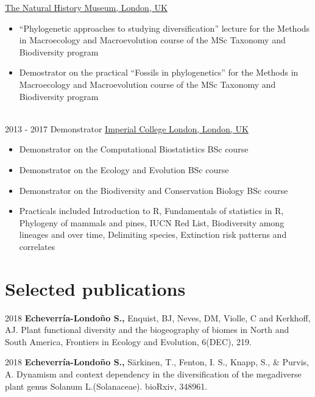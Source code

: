 \documentclass[letterpaper]{twentysecondcv} %
\begin{document}
\begin{twenty}
        {\href{http://www.nhm.ac.uk/}{The Natural History Museum, London, UK}}
        {}
        {
        {\begin{itemize}
        \item ``Phylogenetic approaches to studying diversification'' lecture for the Methods in Macroecology and Macroevolution course of the MSc Taxonomy and Biodiversity program
        \item Demostrator on the practical ``Fossils in phylogenetics'' for the Methods in Macroecology and Macroevolution course of the MSc Taxonomy and Biodiversity program
    \end{itemize}}
	}
    \\   
	\twentyitem
	{2013 - }
	{2017}
	{Demonstrator}
	{\href{https://www.imperial.ac.uk/}{Imperial College London, London, UK}}
	{}
	{
	 {\begin{itemize}
		\item Demonstrator on the Computational Biostatistics BSc course
		\item Demonstrator on the Ecology and Evolution BSc course
		\item Demonstrator on the Biodiversity and Conservation Biology BSc course
		\item Practicals included Introduction to R, Fundamentals of statistics in R, Phylogeny of mammals and pines, IUCN Red List, Biodiversity among lineages and over time, Delimiting species, Extinction risk patterns and correlates
		
	\end{itemize}}
    	}
        
\end{twenty}


\section{Selected publications}

2018 \textbf{Echeverr\'ia-Londo\~no S.,} Enquist, BJ, Neves, DM, Violle, C and Kerkhoff, AJ.  Plant functional diversity and the biogeography of biomes in North and South America, Frontiers in Ecology and Evolution, 6(DEC), 219.

2018 \textbf{Echeverr\'ia-Londo\~no S.,}  S{\"a}rkinen, T., Fenton, I. S., Knapp, S., \& Purvis, A. Dynamism and context dependency in the diversification of the megadiverse plant genus Solanum L.(Solanaceae). bioRxiv, 348961.
\end{document}
